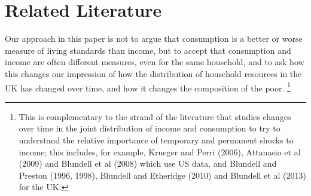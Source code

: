 \section{Related Literature}\label{sec:literature}


Our approach in this paper is not to argue that consumption is a better or worse measure of living standards than income, but to accept that consumption and income are often different measures, even for the same household, and to ask how this changes our impression of how the distribution of household resources in the UK has changed over time, and how it changes the composition of the poor. \footnote{This is complementary to the strand of the literature that studies changes over time in the joint distribution of income and consumption to try to understand the relative importance of temporary and permanent shocks to income; this includes, for example, Krueger and Perri (2006), Attanasio et al (2009) and Blundell et al (2008) which use US data, and Blundell and Preston (1996, 1998), Blundell and Etheridge (2010) and Blundell et al (2013) for the UK.} 

